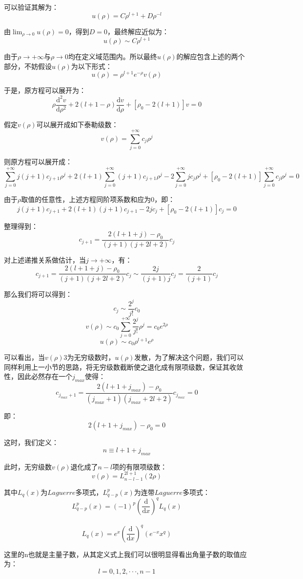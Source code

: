 可以验证其解为：
\[u(\rho)=C\rho^{l+1}+D\rho^{-l}\]

由$\lim_{\rho \rightarrow 0}u(\rho)=0$，得到$D=0$，最终解应近似为：
\[u(\rho) \sim C\rho^{l+1}\]

由于$\rho \rightarrow +\infty$与$\rho \rightarrow 0$均在定义域范围内。所以最终$u(\rho)$的解应包含上述的两个部分，不妨假设$u(\rho)$为以下形式：
\[u(\rho)=\rho^{l+1}e^{-\rho}v(\rho)\]

于是，原方程可以展开为：
\[\rho\frac{\mathrm{d^2}v}{\mathrm{d}\rho^2} +2(l+1-\rho)\frac{\mathrm{d}v}{\mathrm{d}\rho}+[\rho_0-2(l+1)]v=0 \]

假定$v(\rho)$可以展开成如下泰勒级数：
\[v(\rho)=\sum_{j=0}^{+\infty}c_j\rho^j\]

则原方程可以展开成：
\[\sum_{j=0}^{+\infty}j(j+1)c_{j+1}\rho^j+2(l+1)\sum_{j=0}^{+\infty}(j+1)c_{j+1}\rho^j-2\sum_{j=0}^{+\infty}jc_j\rho^j+[\rho_0-2(l+1)]\sum_{j=0}^{+\infty}c_j\rho^j=0\]

由于$\rho$取值的任意性，上述方程同阶项系数和应为0，即：
\[j(j+1)c_{j+1}+2(l+1)(j+1)c_{j+1}-2jc_j+[\rho_0-2(l+1)]c_j=0\]

整理得到：
\[c_{j+1}=\frac{2(l+1+j)-\rho_0}{(j+1)(j+2l+2)}c_j\]

对上述递推关系做估计，当$j \rightarrow +\infty$，有：
\[c_{j+1}=\frac{2(l+1+j)-\rho_0}{(j+1)(j+2l+2)}c_j \sim \frac{2j}{(j+1)j}c_j=\frac{2}{(j+1)}c_j\]

那么我们将可以得到：
\[c_j \sim \frac{2^j}{j!}c_0\]
\[v(\rho) \sim c_0\sum_{j=0}^{+\infty}\frac{2^j}{j!}\rho^j=c_0e^{2\rho}\]
\[u(\rho) \sim c_0\rho^{l+1}e^{\rho}\]

可以看出，当$v(\rho)$3为无穷级数时，$u(\rho)$发散，为了解决这个问题，我们可以同样利用上一小节的思路，将无穷级数截断使之退化成有限项级数，保证其收敛性，因此必然存在一个$j_{max}$使得：
\[c_{j_{max}+1}=\frac{2(l+1+j_{max})-\rho_0}{(j_{max}+1)(j_{max}+2l+2)}c_{j_{max}}=0\]

即：
\[2(l+1+j_{max})-\rho_0=0\]

这时，我们定义：
\[n \equiv l+1+j_{max}\]

此时，无穷级数$v(\rho)$退化成了$n-l$项的有限项级数：
\[v(\rho)=L_{n-l-1}^{2l+1}(2\rho)\]

其中$L_q(x)$为$Laguerre$多项式，$L_{q-p}^{p}(x)$为连带$Laguerre$多项式：
\[L_{q-p}^{p}(x)=(-1)^p \left ( \frac{\mathrm{d}}{\mathrm{d}x} \right )^qL_q(x)\]\
\[L_q(x)=e^x\left ( \frac{\mathrm{d}}{\mathrm{d}x} \right )^q(e^{-x}x^q)\]

这里的n也就是主量子数，从其定义式上我们可以很明显得看出角量子数的取值应为：
\[l=0,1,2, \cdot\cdot\cdot ,n-1\]

